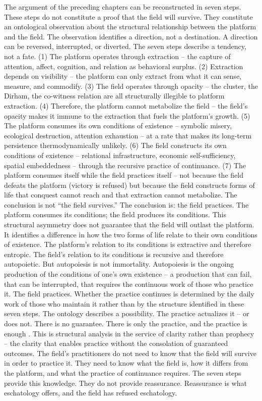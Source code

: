 The argument of the preceding chapters can be reconstructed in seven steps. These steps do not constitute a proof that the field will survive. They constitute an ontological observation about the structural relationship between the platform and the field. The observation identifies a direction, not a destination. A direction can be reversed, interrupted, or diverted. The seven steps describe a tendency, not a fate. (1) The platform operates through extraction – the capture of attention, affect, cognition, and relation as behavioral surplus. (2) Extraction depends on visibility – the platform can only extract from what it can sense, measure, and commodify. (3) The field operates through opacity – the cluster, the Dirham, the co-witness relation are all structurally illegible to platform extraction. (4) Therefore, the platform cannot metabolize the field – the field’s opacity makes it immune to the extraction that fuels the platform’s growth. (5) The platform consumes its own conditions of existence – symbolic misery, ecological destruction, attention exhaustion – at a rate that makes its long-term persistence thermodynamically unlikely. (6) The field constructs its own conditions of existence – relational infrastructure, economic self-sufficiency, spatial embeddedness – through the recursive practice of continuance. (7) The platform consumes itself while the field practices itself – not because the field defeats the platform (victory is refused) but because the field constructs forms of life that conquest cannot reach and that extraction cannot metabolize. The conclusion is not “the field survives.” The conclusion is: the field practices. The platform consumes its conditions; the field produces its conditions. This structural asymmetry does not guarantee that the field will outlast the platform. It identifies a difference in how the two forms of life relate to their own conditions of existence. The platform’s relation to its conditions is extractive and therefore entropic. The field’s relation to its conditions is recursive and therefore autopoietic. But autopoiesis is not immortality. Autopoiesis is the ongoing production of the conditions of one’s own existence – a production that can fail, that can be interrupted, that requires the continuous work of those who practice it. The field practices. Whether the practice continues is determined by the daily work of those who maintain it rather than by the structure identified in these seven steps. The ontology describes a possibility. The practice actualizes it – or does not. There is no guarantee. There is only the practice, and the practice is enough \cite{maturana_varela_1972}. This is structural analysis in the service of clarity rather than prophecy – the clarity that enables practice without the consolation of guaranteed outcomes. The field’s practitioners do not need to know that the field will survive in order to practice it. They need to know what the field is, how it differs from the platform, and what the practice of continuance requires. The seven steps provide this knowledge. They do not provide reassurance. Reassurance is what eschatology offers, and the field has refused eschatology.

